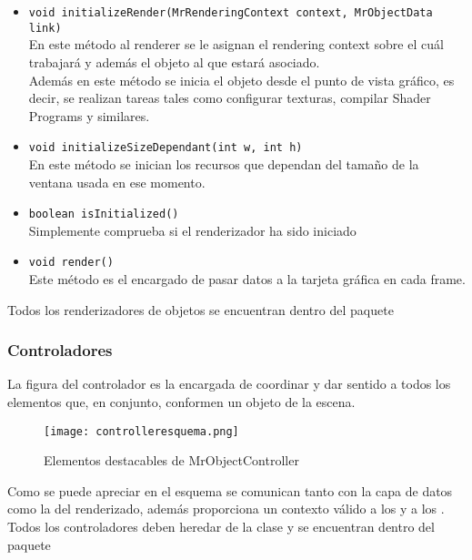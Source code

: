 \begin{itemize}
\item \texttt{void initializeRender(MrRenderingContext context, MrObjectData link)}\\
En este método al renderer se le asignan el rendering context sobre el cuál trabajará y además el objeto al que estará asociado.\\ 
Además en este método se inicia el objeto desde el punto de vista gráfico, es decir, se realizan tareas tales como configurar texturas, compilar Shader Programs y similares.
\item \texttt{void initializeSizeDependant(int w, int h)}\\
En este método se inician los recursos que dependan del tamaño de la ventana usada en ese momento.
\item \texttt{boolean isInitialized()}\\
Simplemente comprueba si el renderizador ha sido iniciado
\item \texttt{void render()}\\
Este método es el encargado de pasar datos a la tarjeta gráfica en cada frame.
\end{itemize}
Todos los renderizadores de objetos se encuentran dentro del paquete 
\subsubsection{Controladores}\label{rref:controlador}
La figura del controlador es la encargada de coordinar y dar sentido a todos los elementos que, en conjunto, conformen un objeto de la escena. 

\begin{figure}[h!]
\begin{center}
\texttt{[image: controlleresquema.png]}
\end{center}
\caption[Elementos destacables de MrObjectController]{Elementos destacables de MrObjectController}
\label{fig:controlleresquema}
\end{figure}

Como se puede apreciar en el esquema se comunican tanto con la capa de datos como la del renderizado, además proporciona un contexto válido a los \rorefobject y a los \rorefeventlistener.\\

Todos los controladores deben heredar de la clase \rorefobjectcontroller y se encuentran dentro del paquete \\

